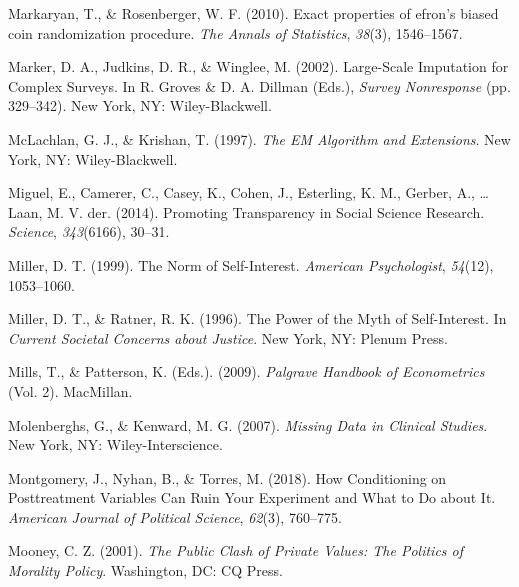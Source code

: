\documentclass[12pt,econ]{sources/authesis}
\newenvironment{CSLReferences}%
  {}%
  {\par}
\begin{document}
\begin{CSLReferences}{1}{0}
\leavevmode{}%
Markaryan, T., \& Rosenberger, W. F. (2010). Exact properties of efron's biased coin randomization procedure. \emph{The Annals of Statistics}, \emph{38}(3), 1546--1567.

\leavevmode{}%
Marker, D. A., Judkins, D. R., \& Winglee, M. (2002). {Large-Scale Imputation for Complex Surveys}. In R. Groves \& D. A. Dillman (Eds.), \emph{{Survey Nonresponse}} (pp. 329--342). New York, NY: Wiley-Blackwell.

\leavevmode{}%
McLachlan, G. J., \& Krishan, T. (1997). \emph{{The EM Algorithm and Extensions}}. New York, NY: Wiley-Blackwell.

\leavevmode{}%
Miguel, E., Camerer, C., Casey, K., Cohen, J., Esterling, K. M., Gerber, A., \ldots{} Laan, M. V. der. (2014). {Promoting Transparency in Social Science Research}. \emph{Science}, \emph{343}(6166), 30--31.

\leavevmode{}%
Miller, D. T. (1999). The {Norm} of {Self}-{Interest}. \emph{American Psychologist}, \emph{54}(12), 1053--1060.

\leavevmode{}%
Miller, D. T., \& Ratner, R. K. (1996). The {Power} of the {Myth} of {Self}-{Interest}. In \emph{Current {Societal} {Concerns} about {Justice}}. New York, NY: Plenum Press.

\leavevmode{}%
Mills, T., \& Patterson, K. (Eds.). (2009). \emph{{Palgrave Handbook of Econometrics}} (Vol. 2). MacMillan.

\leavevmode{}%
Molenberghs, G., \& Kenward, M. G. (2007). \emph{{Missing Data in Clinical Studies}}. New York, NY: Wiley-Interscience.

\leavevmode{}%
Montgomery, J., Nyhan, B., \& Torres, M. (2018). {How Conditioning on Posttreatment Variables Can Ruin Your Experiment and What to Do about It}. \emph{American Journal of Political Science}, \emph{62}(3), 760--775.

\leavevmode{}%
Mooney, C. Z. (2001). \emph{The {Public} {Clash} of {Private} {Values}: {The} {Politics} of {Morality} {Policy}}. Washington, DC: CQ Press.


\end{CSLReferences}
\end{document}
